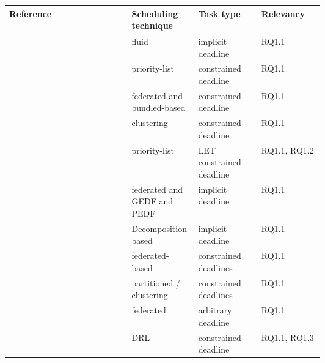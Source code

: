 \begin{table}
    \centering
    \begin{tabular}[]{|l|p{0.20\linewidth}|p{0.20\linewidth}|p{0.20\linewidth}|}
        \hline
        \textbf{Reference} & \textbf{Scheduling technique} & \textbf{Task type} & \textbf{Relevancy}\\
        \hline
        \cite{guan2021DAGfluid} & fluid & implicit deadline & RQ1.1\\%
        \hline
        \cite{He2019DagIntra} & priority-list & constrained deadline & RQ1.1\\%
        \hline
        \cite{Kobayashi2023FedBundledDagsched} & federated and bundled-based & constrained deadline & RQ1.1\\%
        \hline
        \cite{Xiao2019}  & clustering & constrained deadline & RQ1.1\\%
        \hline
        \cite{Igarashi2020HeuristicContentionFree}  & priority-list & LET constrained deadline & RQ1.1, RQ1.2\\%
        \hline
        \cite{jiangUtilTensityBound}  & federated and GEDF and PEDF & implicit deadline & RQ1.1\\%
        \hline
        \cite{JiangDecompoSchedParallelTask} & Decomposition-based & implicit deadline & RQ1.1\\%
        \hline
        \cite{He2023DegreeOfParallelism}\cite{JiangVirtuallyFederatedSched2021}\cite{Jiang2023SchedVirtualProcs} & federated-based & constrained deadlines & RQ1.1\\%
        \hline
        \cite{Shi2024DagExecGroups}  & partitioned / clustering & constrained deadlines & RQ1.1\\%
        \hline
        \cite{Guan2023FederatedNew}  & federated & arbitrary deadline & RQ1.1\\%
        \hline
        \cite{Zhao2024GATDRLmodel}\cite{Lee2021GlobalDagSchedDRL}\cite{GuanFRTDS2020RL} & DRL & constrained deadline & RQ1.1, RQ1.3\\%
        \hline

\end{tabular}
\end{table}

